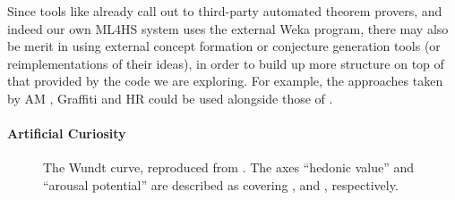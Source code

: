 Since tools like \hspec{} already call out to third-party automated theorem
provers, and indeed our own ML4HS system uses the external Weka program, there
may also be merit in using external concept formation or conjecture generation
tools (or reimplementations of their ideas), in order to build up more structure
on top of that provided by the code we are exploring. For example, the
approaches taken by AM \cite{lenat1977automated, lenat1979automated}, Graffiti
\cite{delavina2005some, delavina2005graffiti} and HR
\cite{colton1999automatic, colton2000agent} could be used alongside those of
\qspec{}.

\paragraph{Artificial Curiosity} \label{sec:curiosity} \leavevmode \newline

\begin{figure}
  \centering

  \caption{The Wundt curve, reproduced from \cite{berlyne1970novelty}. The axes ``hedonic value'' and ``arousal potential'' are described as covering , and , respectively.}

  \label{fig:wundt}
\end{figure}


